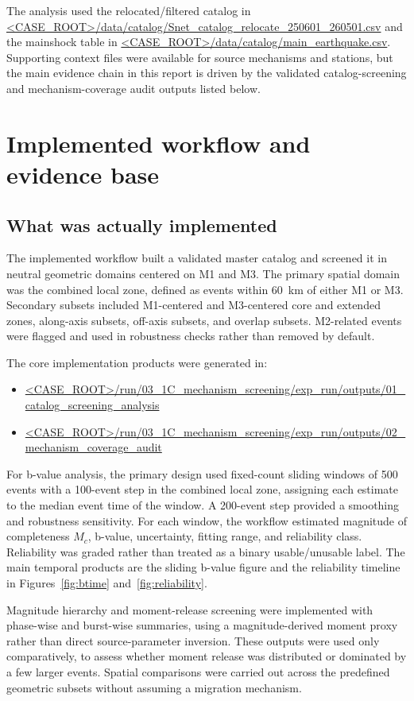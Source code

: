 \documentclass[11pt]{article}
\begin{document}
The analysis used the relocated/filtered catalog in
\url{<CASE_ROOT>/data/catalog/Snet_catalog_relocate_250601_260501.csv}
and the mainshock table in
\url{<CASE_ROOT>/data/catalog/main_earthquake.csv}.
Supporting context files were available for source mechanisms and stations, but the main evidence chain in this report is driven by the validated catalog-screening and mechanism-coverage audit outputs listed below.

\section{Implemented workflow and evidence base}
\subsection{What was actually implemented}
The implemented workflow built a validated master catalog and screened it in neutral geometric domains centered on M1 and M3. The primary spatial domain was the combined local zone, defined as events within \SI{60}{km} of either M1 or M3. Secondary subsets included M1-centered and M3-centered core and extended zones, along-axis subsets, off-axis subsets, and overlap subsets. M2-related events were flagged and used in robustness checks rather than removed by default.

The core implementation products were generated in:
\begin{itemize}[leftmargin=2em]
    \item \url{<CASE_ROOT>/run/03_1C_mechanism_screening/exp_run/outputs/01_catalog_screening_analysis}
    \item \url{<CASE_ROOT>/run/03_1C_mechanism_screening/exp_run/outputs/02_mechanism_coverage_audit}
\end{itemize}

For b-value analysis, the primary design used fixed-count sliding windows of 500 events with a 100-event step in the combined local zone, assigning each estimate to the median event time of the window. A 200-event step provided a smoothing and robustness sensitivity. For each window, the workflow estimated magnitude of completeness $M_c$, b-value, uncertainty, fitting range, and reliability class. Reliability was graded rather than treated as a binary usable/unusable label. The main temporal products are the sliding b-value figure and the reliability timeline in Figures~\ref{fig:btime} and~\ref{fig:reliability}.

Magnitude hierarchy and moment-release screening were implemented with phase-wise and burst-wise summaries, using a magnitude-derived moment proxy rather than direct source-parameter inversion. These outputs were used only comparatively, to assess whether moment release was distributed or dominated by a few larger events. Spatial comparisons were carried out across the predefined geometric subsets without assuming a migration mechanism.
\end{document}
